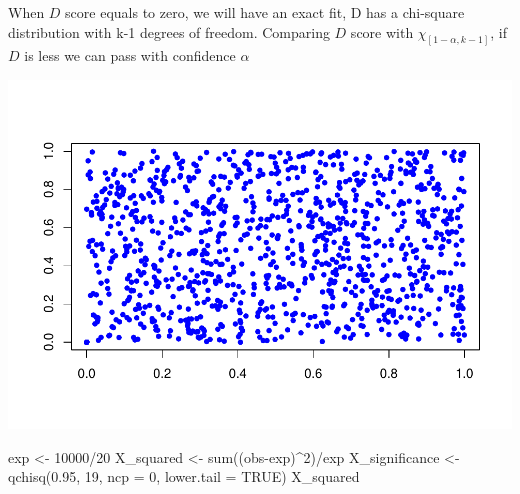\documentclass[
]{article}
\newenvironment{Shaded}{\begin{snugshade}}{\end{snugshade}}
\newcommand{\AttributeTok}[1]{\textcolor[rgb]{0.77,0.63,0.00}{#1}}
\newcommand{\ConstantTok}[1]{\textcolor[rgb]{0.00,0.00,0.00}{#1}}
\newcommand{\DecValTok}[1]{\textcolor[rgb]{0.00,0.00,0.81}{#1}}
\newcommand{\FloatTok}[1]{\textcolor[rgb]{0.00,0.00,0.81}{#1}}
\newcommand{\FunctionTok}[1]{\textcolor[rgb]{0.00,0.00,0.00}{#1}}
\newcommand{\NormalTok}[1]{#1}
\newcommand{\OtherTok}[1]{\textcolor[rgb]{0.56,0.35,0.01}{#1}}
\newcommand{\SpecialCharTok}[1]{\textcolor[rgb]{0.00,0.00,0.00}{#1}}
\begin{document}
When \(D\) score equals to zero, we will have an exact fit, D has a
chi-square distribution with k-1 degrees of freedom. Comparing \(D\)
score with \(\chi_[1-\alpha, k-1]\), if \(D\) is less we can pass with
confidence \(\alpha\)

\begin{Shaded}
\end{Shaded}

\includegraphics{TP2_files/figure-latex/unnamed-chunk-3-1.pdf}

\begin{Shaded}
\begin{Highlighting}[]
\NormalTok{exp }\OtherTok{\textless{}{-}}  \DecValTok{10000}\SpecialCharTok{/}\DecValTok{20}
\NormalTok{X\_squared }\OtherTok{\textless{}{-}} \FunctionTok{sum}\NormalTok{((obs}\SpecialCharTok{{-}}\NormalTok{exp)}\SpecialCharTok{\^{}}\DecValTok{2}\NormalTok{)}\SpecialCharTok{/}\NormalTok{exp}
\NormalTok{X\_significance }\OtherTok{\textless{}{-}} \FunctionTok{qchisq}\NormalTok{(}\FloatTok{0.95}\NormalTok{, }\DecValTok{19}\NormalTok{, }\AttributeTok{ncp =} \DecValTok{0}\NormalTok{, }\AttributeTok{lower.tail =} \ConstantTok{TRUE}\NormalTok{)}
\NormalTok{X\_squared }
\end{Highlighting}
\end{Shaded}
\end{document}
